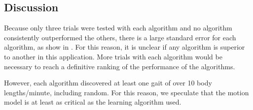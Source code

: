\subsection{Discussion}

Because only three trials were tested with each algorithm and no
algorithm consistently outperformed the others, there is a large
standard error for each algorithm, as show in . For
this reason, it is unclear if any algorithm is superior to another in
this application. More trials with each algorithm would be necessary
to reach a definitive ranking of the performance of the algorithms.

However, each algorithm discovered at least one gait of over 10 body
lengths/minute, including random. For this reason, we speculate that
the motion model is at least as critical as the learning algorithm
used.

